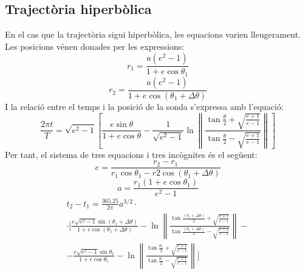 \subsection{Trajectòria hiperbòlica}
En el cas que la trajectòria sigui hiperbòlica, les equacions varien lleugerament. Les posicions vénen donades per les expressions:
\begin{equation}
r_{1}=\frac{a\left(e^{2}-1\right)}{1+e\cos\theta_{1}}
\end{equation}
\begin{equation}
r_{2}=\frac{a\left(e^{2}-1\right)}{1+e\cos\left(\theta_{1}+\Delta\theta\right)}
\end{equation}
I la relació entre el temps i la posició de la sonda s'expressa amb l'equació:
\begin{equation}
\frac{2\pi t}{T}=\sqrt{e^{2}-1}\left[\frac{e\sin\theta}{1+e\cos\theta}-\frac{1}{\sqrt{e^{2}-1}}\ln\left\|\frac{\tan\frac{\theta}{2}+\sqrt{\frac{e+1}{e-1}}}{\tan\frac{\theta}{2}-\sqrt{\frac{e+1}{e-1}}}\right\|\right]
\end{equation}
Per tant, el sistema de tres equacions i tres incògnites és el següent:
\begin{equation}
e=\frac{r_{2}-r_{1}}{r_{1}\cos\theta_{1}-r{2}\cos\left(\theta_{1}+\Delta\theta\right)}
\label{eqeh}
\end{equation}
\begin{equation}
a=\frac{r_{1}\left(1+e\cos\theta_{1}\right)}{e^{2}-1}
\label{eqah}
\end{equation}
\begin{multline}
	t_{2}-t_{1}=\frac{365.25}{2\pi}a^{3/2}\cdot \\
	\cdot\Bigg[\frac{e\sqrt{e^{2}-1}\sin{\left(\theta_{1}+\Delta\theta\right)}}{1+e\cos{\left(\theta_{1}+\Delta\theta\right)}}-\ln\left\|\frac{\tan\frac{\left(\theta_{1}+\Delta\theta\right)}{2}+\sqrt{\frac{e+1}{e-1}}}{\tan\frac{\left(\theta_{1}+\Delta\theta\right)}{2}-\sqrt{\frac{e+1}{e-1}}}\right\|- \\
	-\frac{e\sqrt{e^{2}-1}\sin{\theta_{1}}}{1+e\cos{\theta_{1}}}-\ln\left\|\frac{\tan\frac{\theta_{1}}{2}+\sqrt{\frac{e+1}{e-1}}}{\tan\frac{\theta_{1}}{2}-\sqrt{\frac{e+1}{e-1}}}\right\|\Bigg]
	\label{eqth}
\end{multline}

